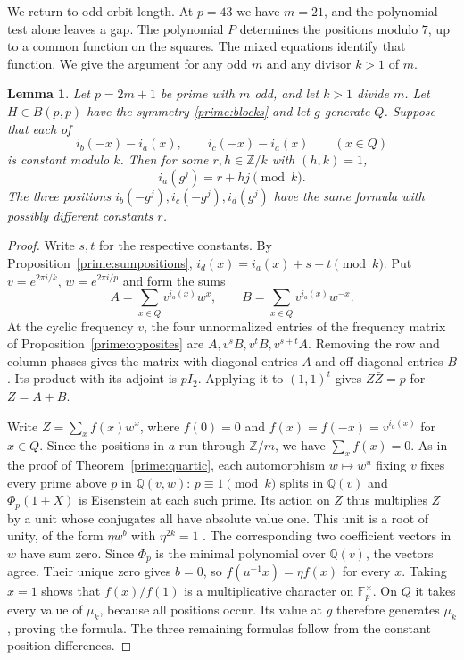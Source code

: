 \documentclass[11pt,a4paper]{article}
\newtheorem{lemma}[theorem]{Lemma}
\numberwithin{equation}{section}
\begin{document}
We return to odd orbit length. At $p=43$ we have $m=21$, and the polynomial test alone leaves a gap. The polynomial $P$ determines the positions modulo $7$, up to a common function on the squares. The mixed equations identify that function. We give the argument for any odd $m$ and any divisor $k>1$ of $m$.

\begin{lemma}\label{prime:positions-character}
Let $p=2m+1$ be prime with $m$ odd, and let $k>1$ divide $m$. Let $H\in B(p,p)$ have the symmetry \eqref{prime:blocks} and let $g$ generate $Q$. Suppose that each of
$$i_b(-x)-i_a(x),\qquad i_c(-x)-i_a(x)\qquad (x\in Q)$$
is constant modulo $k$. Then for some $r,h\in\mathbb Z/k$ with $(h,k)=1$,
$$i_a(g^j)=r+hj\pmod k.$$
The three positions $i_b(-g^j),i_c(-g^j),i_d(g^j)$ have the same formula with possibly different constants $r$.
\end{lemma}
\begin{proof}
Write $s,t$ for the respective constants. By Proposition~\ref{prime:sumpositions}, $i_d(x)=i_a(x)+s+t\pmod k$. Put $v=e^{2\pi i/k}$, $w=e^{2\pi i/p}$ and form the sums
$$A=\sum_{x\in Q}v^{i_a(x)}w^x,\qquad B=\sum_{x\in Q}v^{i_a(x)}w^{-x}.$$
At the cyclic frequency $v$, the four unnormalized entries of the frequency matrix of Proposition~\ref{prime:opposites} are $A,v^sB,v^tB,v^{s+t}A$. Removing the row and column phases gives the matrix with diagonal entries $A$ and off-diagonal entries $B$. Its product with its adjoint is $pI_2$. Applying it to $(1,1)^t$ gives $Z\bar Z=p$ for $Z=A+B$.

Write $Z=\sum_x f(x)w^x$, where $f(0)=0$ and $f(x)=f(-x)=v^{i_a(x)}$ for $x\in Q$. Since the positions in $a$ run through $\mathbb Z/m$, we have $\sum_x f(x)=0$. As in the proof of Theorem~\ref{prime:quartic}, each automorphism $w\mapsto w^u$ fixing $v$ fixes every prime above $p$ in $\mathbb Q(v,w)$: $p\equiv1\pmod k$ splits in $\mathbb Q(v)$ and $\Phi_p(1+X)$ is Eisenstein at each such prime. Its action on $Z$ thus multiplies $Z$ by a unit whose conjugates all have absolute value one. This unit is a root of unity, of the form $\eta w^b$ with $\eta^{2k}=1$ \cite{washington}. The corresponding two coefficient vectors in $w$ have sum zero. Since $\Phi_p$ is the minimal polynomial over $\mathbb Q(v)$, the vectors agree. Their unique zero gives $b=0$, so $f(u^{-1}x)=\eta f(x)$ for every $x$. Taking $x=1$ shows that $f(x)/f(1)$ is a multiplicative character on $\mathbb F_p^\times$. On $Q$ it takes every value of $\mu_k$, because all positions occur. Its value at $g$ therefore generates $\mu_k$, proving the formula. The three remaining formulas follow from the constant position differences.
\end{proof}
\end{document}
